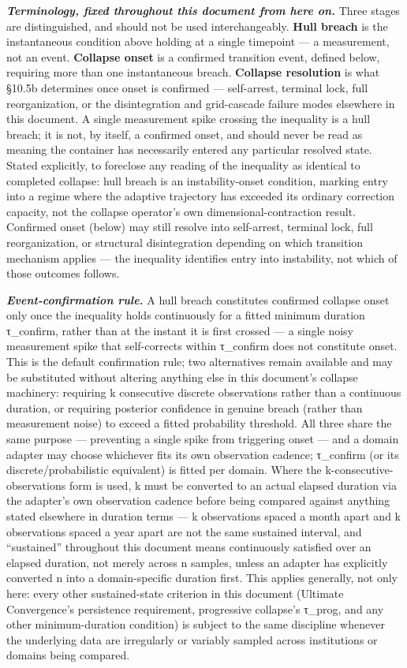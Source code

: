 \documentclass[
]{article}
\begin{document}
\emph{\textbf{Terminology, fixed throughout this document from here
on.}} Three stages are distinguished, and should not be used
interchangeably. \textbf{Hull breach} is the instantaneous condition
above holding at a single timepoint --- a measurement, not an event.
\textbf{Collapse onset} is a confirmed transition event, defined below,
requiring more than one instantaneous breach. \textbf{Collapse
resolution} is what §10.5b determines once onset is confirmed ---
self-arrest, terminal lock, full reorganization, or the disintegration
and grid-cascade failure modes elsewhere in this document. A single
measurement spike crossing the inequality is a hull breach; it is not,
by itself, a confirmed onset, and should never be read as meaning the
container has necessarily entered any particular resolved state. Stated
explicitly, to foreclose any reading of the inequality as identical to
completed collapse: hull breach is an instability-onset condition,
marking entry into a regime where the adaptive trajectory has exceeded
its ordinary correction capacity, not the collapse operator's own
dimensional-contraction result. Confirmed onset (below) may still
resolve into self-arrest, terminal lock, full reorganization, or
structural disintegration depending on which transition mechanism
applies --- the inequality identifies entry into instability, not which
of those outcomes follows.

\emph{\textbf{Event-confirmation rule.}} A hull breach constitutes
confirmed collapse onset only once the inequality holds continuously for
a fitted minimum duration τ\_confirm, rather than at the instant it is
first crossed --- a single noisy measurement spike that self-corrects
within τ\_confirm does not constitute onset. This is the default
confirmation rule; two alternatives remain available and may be
substituted without altering anything else in this document's collapse
machinery: requiring k consecutive discrete observations rather than a
continuous duration, or requiring posterior confidence in genuine breach
(rather than measurement noise) to exceed a fitted probability
threshold. All three share the same purpose --- preventing a single
spike from triggering onset --- and a domain adapter may choose
whichever fits its own observation cadence; τ\_confirm (or its
discrete/probabilistic equivalent) is fitted per domain. Where the
k-consecutive-observations form is used, k must be converted to an
actual elapsed duration via the adapter's own observation cadence before
being compared against anything stated elsewhere in duration terms --- k
observations spaced a month apart and k observations spaced a year apart
are not the same sustained interval, and ``sustained'' throughout this
document means continuously satisfied over an elapsed duration, not
merely across n samples, unless an adapter has explicitly converted n
into a domain-specific duration first. This applies generally, not only
here: every other sustained-state criterion in this document (Ultimate
Convergence's persistence requirement, progressive collapse's τ\_prog,
and any other minimum-duration condition) is subject to the same
discipline whenever the underlying data are irregularly or variably
sampled across institutions or domains being compared.
\end{document}
